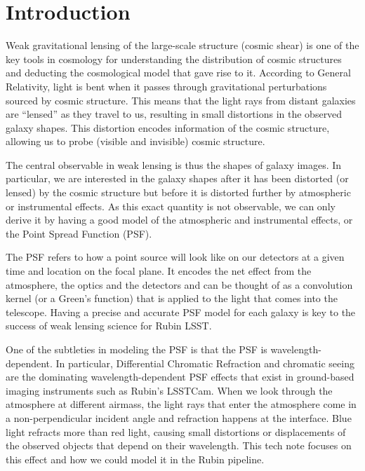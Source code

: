 \section{Introduction}
Weak gravitational lensing of the large-scale structure (cosmic shear) is one of the key tools in cosmology for understanding the distribution of cosmic structures and deducting the cosmological model that gave rise to it. 
According to General Relativity, light is bent when it passes through gravitational perturbations sourced by cosmic structure. 
This means that the light rays from distant galaxies are ``lensed'' as they travel to us, resulting in small distortions in the observed galaxy shapes. 
This distortion encodes information of the cosmic structure, allowing us to probe (visible and invisible) cosmic structure.

The central observable in weak lensing is thus the shapes of galaxy images. 
In particular, we are interested in the galaxy shapes after it has been distorted (or lensed) by the cosmic structure but before it is distorted further by atmospheric or instrumental effects.
As this exact quantity is not observable, we can only derive it by having a good model of the atmospheric and instrumental effects, or the Point Spread Function (PSF).

The PSF refers to how a point source will look like on our detectors at a given time and location on the focal plane. 
It encodes the net effect from the atmosphere, the optics and the detectors and can be thought of as a convolution kernel (or a Green's function) that is applied to the light that comes into the telescope. 
Having a precise and accurate PSF model for each galaxy is key to the success of weak lensing science for Rubin LSST.

One of the subtleties in modeling the PSF is that the PSF is wavelength-dependent. 
In particular, Differential Chromatic Refraction \citep[DCR,][]{DMTN-017, 2012PASP..124.1113A, 2015ApJ...807..182M} and chromatic seeing are the dominating wavelength-dependent PSF effects that exist in ground-based imaging instruments such as Rubin's LSSTCam. When we look through the atmosphere at different airmass, the light rays that enter the atmosphere come in a non-perpendicular incident angle and refraction happens at the interface.
Blue light refracts more than red light, causing small distortions or displacements of the observed objects that depend on their wavelength. 
This tech note focuses on this effect and how we could model it in the Rubin pipeline.

